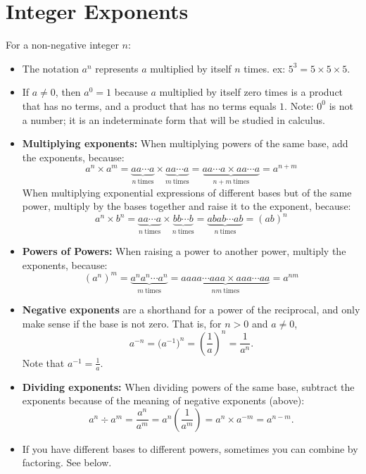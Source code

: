 \documentclass[11pt]{book}               %
\begin{document}
\section{Integer Exponents}
For a non-negative integer $n$:
\begin{itemize}
\item The notation $ a^n $ represents $ a $ multiplied by itself $ n $ times. ex: $ 5^3 = 5 \times 5 \times 5$.

\item If $a \neq 0$, then $a^0 = 1$ because $a$ multiplied by itself zero times is a product that has no terms, and a product that has no terms equals $1$.  Note: $0^0$ is not a number; it is an indeterminate form that will be studied in calculus.


\item \textbf{Multiplying exponents:} When multiplying powers of the same base, add the exponents, because:  
$$ a^n  \times a^m = \underbrace{aa\cdots a}_{n\ \mathrm{times}}  \times \underbrace{aa\cdots a}_{m\ \mathrm{times} } 
= \underbrace{aa\cdots a \times aa\cdots a}_{n+m\ \mathrm{times} } = a^{n+m} $$
When multiplying exponential expressions of different bases but of the same power, multiply by the bases together and raise it to the exponent, because:
$$ a^n\times b^n = \underbrace{aa\cdots a}_{n\ \mathrm{times}}  \times \underbrace{bb\cdots b}_{n\ \mathrm{times} } 
= \underbrace{abab \cdots ab}_{n\ \mathrm{times} } = (ab)^n $$

\item \textbf{Powers of Powers:} When raising a power to another power, multiply the exponents, because: 
$$ (a^n)^m  =  \underbrace{a^n a^n\cdots a^n}_{m\ \mathrm{times}}= \underbrace{aaaa\cdots aaa \times aaa\cdots aa}_{nm\ \mathrm{times} } =  a^{nm} $$
\item {\bf Negative exponents} are a shorthand for a power of the reciprocal, and only make sense if the base is not zero. That is, for $n > 0$ and $a \neq 0$, 
 $$a^{-n} =  \big( a^{-1} \big)^n = \left( \frac{1}{a} \right)^n= \frac{1}{a^n}.$$  Note that  $a^{-1} = \frac{1}{a}.$

\item \textbf{Dividing exponents:} When dividing powers of the same base, subtract the exponents because of the meaning of negative exponents (above): 
$$ a^n \div a^m = \frac{a^n}{a^m}= a^n\left(\frac{1}{a^m}\right)= a^n \times a^{-m} =  a^{n-m}. $$


\item If you have different bases to different powers, sometimes you can combine by factoring. See below.
\end{itemize}
\end{document}
